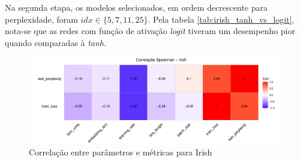 \documentclass[twoside]{automatextcc}
\begin{document}
Na segunda etapa, os modelos selecionados, em ordem decrescente para perplexidade, foram $idx \in \{5,7,11,25\}$. Pela tabela \ref{tab:irish_tanh_vs_logit}, nota-se que as redes com função de ativação \textit{logit} tiveram um desempenho pior quando comparadas à \textit{tanh}.

\begin{figure}[H]
    \centering
    \includegraphics[width=\textwidth]{irish_tanh_corr.pdf}
    \caption{Correlação entre parâmetros e métricas para Irish}
    \label{fig:irish_tanh_corr}
\end{figure}
\end{document}
